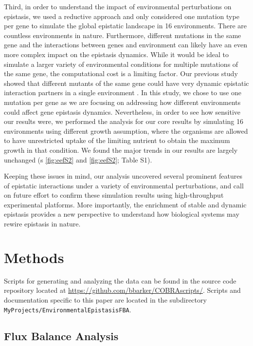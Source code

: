 Third, in order to understand the impact of environmental
perturbations on epistasis, we used a reductive approach and only
considered one mutation type per gene to simulate the global epistatic
landscape in 16 environments. There are countless environments in
nature. Furthermore, different mutations in the same gene and the
interactions between genes and environment can likely have an even
more complex impact on the epistasis dynamics. While it would be ideal
to simulate a larger variety of environmental conditions for multiple
mutations of the same gene, the computational cost is a limiting
factor. Our previous study showed that different mutants of the same
gene could have very dynamic epistatic interaction partners in a
single environment \citep{Xu2012}. In this study, we chose to use one
mutation per gene as we are focusing on addressing how different
environments could affect gene epistasis dynamics. Nevertheless, in
order to see how sensitive our results were, we performed the analysis
for our core results by simulating 16 environments using different
growth assumption, where the organisms are allowed to have
unrestricted uptake of the limiting nutrient to obtain the maximum
growth in that condition. We found the major trends in our results are
largely unchanged (\Fig s \ref{fig:eefS2} and \ref{fig:eefS2}; Table S1).

Keeping these issues in mind, our analysis uncovered several prominent
features of epistatic interactions under a variety of environmental
perturbations, and call on future effort to confirm these simulation
results using high-throughput experimental platforms. More
importantly, the enrichment of stable and dynamic epistasis provides a
new perspective to understand how biological systems may rewire
epistasis in nature.

\section{Methods}

Scripts for generating and analyzing the data can be found in the
source code repository located at
\url{https://github.com/bbarker/COBRAscripts/}. Scripts and
documentation specific to this paper are located in the subdirectory
\texttt{MyProjects/EnvironmentalEpistasisFBA}.

\subsection{Flux Balance Analysis}

